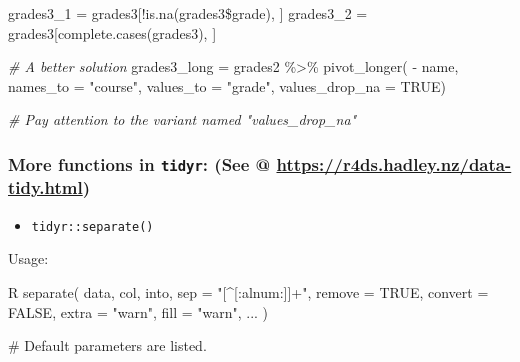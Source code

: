 \documentclass[
]{article}
\newenvironment{Shaded}{}{}
\newcommand{\AttributeTok}[1]{\textcolor[rgb]{0.49,0.56,0.16}{#1}}
\newcommand{\CommentTok}[1]{\textcolor[rgb]{0.38,0.63,0.69}{\textit{#1}}}
\newcommand{\ConstantTok}[1]{\textcolor[rgb]{0.53,0.00,0.00}{#1}}
\newcommand{\FunctionTok}[1]{\textcolor[rgb]{0.02,0.16,0.49}{#1}}
\newcommand{\NormalTok}[1]{#1}
\newcommand{\OtherTok}[1]{\textcolor[rgb]{0.00,0.44,0.13}{#1}}
\newcommand{\SpecialCharTok}[1]{\textcolor[rgb]{0.25,0.44,0.63}{#1}}
\newcommand{\StringTok}[1]{\textcolor[rgb]{0.25,0.44,0.63}{#1}}
\begin{document}
\begin{Shaded}
\begin{Highlighting}[]
\NormalTok{grades3\_1 }\OtherTok{=}
\NormalTok{	grades3[}\SpecialCharTok{!}\FunctionTok{is.na}\NormalTok{(grades3}\SpecialCharTok{\$}\NormalTok{grade), ]}
\NormalTok{grades3\_2 }\OtherTok{=}
\NormalTok{	grades3[}\FunctionTok{complete.cases}\NormalTok{(grades3), ]}

\CommentTok{\# A better solution}
\NormalTok{grades3\_long }\OtherTok{=}\NormalTok{ grades2 }\SpecialCharTok{\%\textgreater{}\%} 
  \FunctionTok{pivot\_longer}\NormalTok{( }\SpecialCharTok{{-}}\NormalTok{ name, }
                \AttributeTok{names\_to =} \StringTok{"course"}\NormalTok{, }
                \AttributeTok{values\_to =} \StringTok{"grade"}\NormalTok{,}
                \AttributeTok{values\_drop\_na =} \ConstantTok{TRUE}\NormalTok{)}

\CommentTok{\# Pay attention to the variant named "values\_drop\_na"}
\end{Highlighting}
\end{Shaded}

\hypertarget{more-functions-in-tidyr-see--httpsr4dshadleynzdata-tidyhtml}{%
\subsubsection{\texorpdfstring{More functions in \texttt{tidyr}: (See @
\url{https://r4ds.hadley.nz/data-tidy.html})}{More functions in tidyr: (See @ https://r4ds.hadley.nz/data-tidy.html)}}\label{more-functions-in-tidyr-see--httpsr4dshadleynzdata-tidyhtml}}

\begin{itemize}
\item
  \texttt{tidyr::separate()}
\end{itemize}

\begin{Shaded}
\begin{Highlighting}[]
\NormalTok{Usage:}

\NormalTok{\textasciigrave{}\textasciigrave{}\textasciigrave{}R}
\NormalTok{separate(}
\NormalTok{  data,}
\NormalTok{  col,}
\NormalTok{  into,}
\NormalTok{  sep = "[\^{}[:alnum:]]+",}
\NormalTok{  remove = TRUE,}
\NormalTok{  convert = FALSE,}
\NormalTok{  extra = "warn",}
\NormalTok{  fill = "warn",}
\NormalTok{  ...}
\NormalTok{)}

\NormalTok{\# Default parameters are listed.}
\NormalTok{\textasciigrave{}\textasciigrave{}\textasciigrave{}}
\end{Highlighting}
\end{Shaded}
\end{document}
